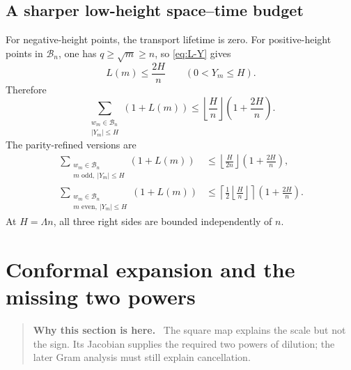 \documentclass[11pt]{article}
\theoremstyle{definition}
\theoremstyle{remark}
\newcommand{\1}{\mathbf{1}}
\newenvironment{motivation}
  {\begin{quote}\small\color{ovvogray}\textbf{Why this section is here.}\ }
  {\end{quote}}
\begin{document}
\subsection{A sharper low-height space--time budget}

For negative-height points, the transport lifetime is zero.  For
positive-height points in $\mathscr B_n$, one has
$q\ge\sqrt m\ge n$, so \cref{eq:L-Y} gives
\begin{equation}
 L(m)\le\frac{2H}{n}
 \qquad(0<Y_m\le H).
 \label{eq:L-H-n}
\end{equation}
Therefore
\begin{equation}
 \boxed{
 \sum_{\substack{w_m\in\mathscr B_n\\|Y_m|\le H}}
 (1+L(m))
 \le
 \left\lfloor\frac{H}{n}\right\rfloor
 \left(1+\frac{2H}{n}\right).
 }
 \label{eq:space-time-budget}
\end{equation}
The parity-refined versions are
\begin{align}
 \sum_{\substack{w_m\in\mathscr B_n\\m\text{ odd},\ |Y_m|\le H}}
 (1+L(m))
 &\le
 \left\lfloor\frac{H}{2n}\right\rfloor
 \left(1+\frac{2H}{n}\right),
 \label{eq:odd-space-time-budget}\\
 \sum_{\substack{w_m\in\mathscr B_n\\m\text{ even},\ |Y_m|\le H}}
 (1+L(m))
 &\le
 \left\lceil\frac{1}{2}
 \left\lfloor\frac{H}{n}\right\rfloor\right\rceil
 \left(1+\frac{2H}{n}\right).
 \label{eq:even-space-time-budget}
\end{align}
At $H=\Lambda n$, all three right sides are bounded independently of
$n$.

\section{Conformal expansion and the missing two powers}
\label{sec:jacobian}

\begin{motivation}
The square map explains the scale but not the sign.  Its Jacobian supplies the required two powers of dilution; the later Gram analysis must still explain cancellation.
\end{motivation}
\end{document}
